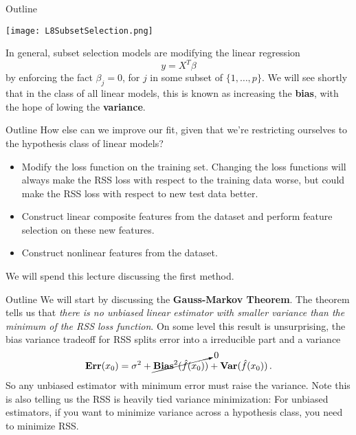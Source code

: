 \documentclass[10pt, table, dvipsnames,xcdraw,handout]{beamer}
\begin{document}
\begin{frame}[fragile]{Outline} 
  \begin{minipage}[t][0.5\textheight][t]{\textwidth}
	\centering \texttt{[image: L8SubsetSelection.png]} 
  \end{minipage}
  \vfill
\begin{minipage}[t][0.5\textheight][t]{\textwidth}
In general, subset selection models are modifying the linear regression
$$
y = {X}^T\beta
$$ 
by enforcing the fact $\beta_j = 0$, for $j$ in some subset of $\{1,\ldots,p\}$. We will see shortly that in the class of all linear models, this is known as increasing the \textbf{bias}, with the hope of lowing the \textbf{variance}.
\end{minipage}

\end{frame}




\begin{frame}[fragile]{Outline} 
How else can we improve our fit, given that we're restricting ourselves to the hypothesis class of linear models? 
\begin{itemize}
\item[] Modify the loss function on the training set. Changing the loss functions will always make the RSS loss with respect to the training data worse, but could make the RSS loss with respect to new test data better. \pause
\item[] Construct linear composite features from the dataset and perform feature selection on these new features.  \pause
\item[] Construct nonlinear features from the dataset. \pause
\end{itemize}
We will spend this lecture discussing the first method.
\end{frame}








\begin{frame}[fragile]{Outline} 
We will start by discussing the \textbf{Gauss-Markov Theorem}. The theorem tells us that \emph{there is no unbiased linear estimator with smaller variance than the minimum of the RSS loss function}. On some level this result is unsurprising, the bias variance tradeoff for RSS splits error into a irreducible part and a variance
\begin{align*}
\textbf{Err}(x_0) = \sigma^2 + \cancelto{0}{ \textbf{Bias}^2(\hat f(x_0))} + \textbf{Var}(\hat f(x_0))\,.
\end{align*}\pause
So any unbiased estimator with minimum error must raise the variance. Note this is also telling us the RSS is heavily tied variance minimization: For unbiased estimators, if you want to minimize variance across a hypothesis class, you need to minimize RSS.
\end{frame}
\end{document}
